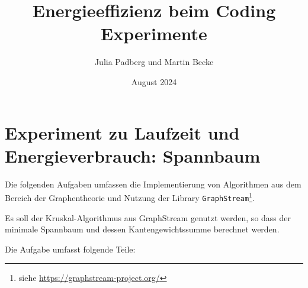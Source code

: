 \documentclass{article}
\title{Energieeffizienz beim Coding\\[2mm]Experimente}
\author{Julia Padberg und Martin Becke}
\date{August 2024}
\begin{document}
\maketitle


\section*{Experiment zu Laufzeit und Energieverbrauch: Spannbaum}

Die folgenden Aufgaben umfassen die Implementierung von  Algorithmen aus dem Bereich der Graphentheorie und  Nutzung der Library \texttt{GraphStream}\footnote{%
   siehe  \href{https://graphstream-project.org/}{https://graphstream-project.org/}}.
	
Es soll der Kruskal-Algorithmus aus GraphStream genutzt werden,  so dass  der minimale Spannbaum   und dessen Kantengewichtssumme berechnet werden.

Die Aufgabe umfasst folgende Teile:
\end{document}
